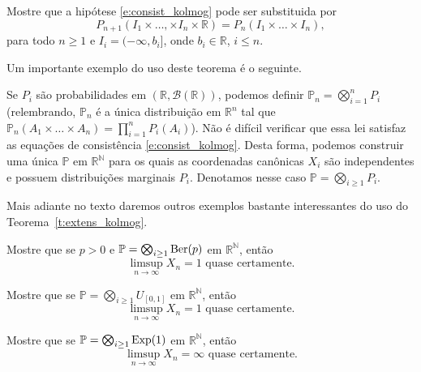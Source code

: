 \begin{exercise}
  Mostre que a hipótese \eqref{e:consist_kolmog} pode ser substituida por
  \begin{equation}
    P_{n+1} (I_1 \times \dots, \times I_n \times \mathbb{R}) = P_n (I_1 \times \dots \times I_n),
  \end{equation}
  para todo $n \geq 1$ e $I_i = (-\infty, b_i]$, onde $b_i \in \mathbb{R}$, $i \leq n$.
\end{exercise}

Um importante exemplo do uso deste teorema é o seguinte.

\begin{example}
  Se $P_i$ são probabilidades em $(\mathbb{R}, \mathcal{B}(\mathbb{R}))$, podemos definir $\mathbb{P}_n = \bigotimes_{i=1}^n P_i$ (relembrando, $\mathbb{P}_n$ é a única distribuição em $\mathbb{R}^n$ tal que $\mathbb{P}_n(A_1 \times \dots \times A_n) = \prod_{i=1}^n P_i(A_i)$).
  Não é difícil verificar que essa lei satisfaz as equações de consistência \eqref{e:consist_kolmog}.
  Desta forma, podemos construir uma única $\mathbb{P}$ em $\mathbb{R}^\mathbb{N}$ para os quais as coordenadas canônicas $X_i$ são independentes e possuem distribuições marginais $P_i$.
  Denotamos nesse caso $\mathbb{P} = \bigotimes_{i \geq 1} P_i$.
\end{example}

Mais adiante no texto daremos outros exemplos bastante interessantes do uso do Teorema~\ref{t:extens_kolmog}.

\begin{exercise}
  Mostre que se $p > 0$ e $\mathbb{P} = \bigotimes_{i \geq 1} \operatorname{Ber}(p)$ em $\mathbb{R}^\mathbb{N}$, então
  \begin{equation}
    \text{$\limsup_{n\to \infty} X_n = 1$ quase certamente.}
  \end{equation}
\end{exercise}

\begin{exercise}
  Mostre que se $\mathbb{P} = \bigotimes_{i \geq 1} U_{[0,1]}$ em $\mathbb{R}^\mathbb{N}$, então
  \begin{equation}
    \text{$\limsup_{n\to \infty} X_n = 1$ quase certamente.}
  \end{equation}
\end{exercise}

\begin{exercise}
  Mostre que se $\mathbb{P} = \bigotimes_{i \geq 1} \operatorname{Exp}(1)$ em $\mathbb{R}^\mathbb{N}$, então
  \begin{equation}
    \text{$\limsup_{n\to \infty} X_n = \infty$ quase certamente.}
  \end{equation}
\end{exercise}

